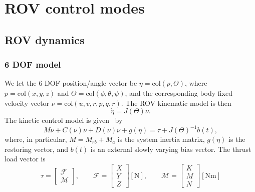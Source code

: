 \documentclass[a4paper,twoside,english]{report}
\begin{document}
\FloatBarrier

\newpage{}

\chapter{ROV control modes}

\section{ROV dynamics}

\subsection{6 DOF model}

We let the 6 DOF position/angle vector be $\eta=\text{col}(p,\Theta)$,
where $p=\text{col}(x,y,z)$ and $\Theta=\text{col}(\phi,\theta,\psi)$,
and the corresponding body-fixed velocity vector $\nu=\text{col}(u,v,r,p,q,r)$.
The ROV kinematic model is then
\begin{equation}
\dot{\eta}=J(\Theta)\nu.
\end{equation}
The kinetic control model is given \ by 
\begin{equation}
M\dot{\nu}+C(\nu)\nu+D(\nu)\nu+g(\eta)=\tau+J(\Theta)^{-1}b(t),\label{Eq_6DOFdyn}
\end{equation}
where, in particular, $M=M_{rb}+M_{a}$ is the system inertia matrix,
$g(\eta)$ is the restoring vector, and $b(t)$ is an external slowly
varying bias vector. The thrust load vector is 
\begin{equation}
\tau=\left[\begin{array}{c}
\mathcal{F}\\
\mathcal{M}
\end{array}\right],\qquad\mathcal{F}=\left[\begin{array}{c}
X\\
Y\\
Z
\end{array}\right]\left[\text{N}\right],\qquad\mathcal{M}=\left[\begin{array}{c}
K\\
M\\
N
\end{array}\right]\left[\text{Nm}\right]
\end{equation}
\end{document}
